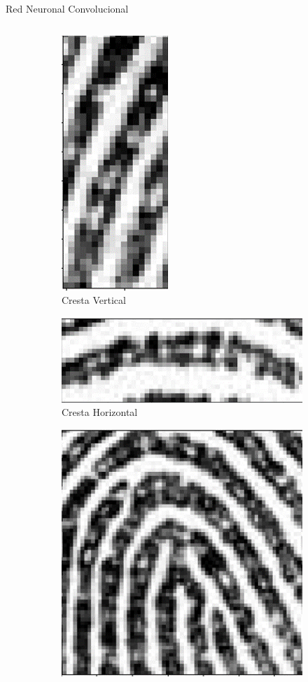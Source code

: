 \documentclass[12pt,aspectratio=169]{beamer}
\begin{document}
\begin{frame}{Red Neuronal Convolucional}
\begin{columns}[c]
\begin{itemize}
                \begin{figure}
                    \begin{subfigure}{0.21\textwidth}
                        \centering
                        \includegraphics[scale=0.1]{figs/fll_0.png}
                        \caption{Cresta Vertical}
                    \end{subfigure}
                    \begin{subfigure}{0.21\textwidth}
                        \centering
                        \includegraphics[scale=0.1]{figs/fll_1.png}
                        \caption{Cresta Horizontal}
                    \end{subfigure}
                    \begin{subfigure}{0.21\textwidth}
                        \centering
                        \includegraphics[scale=0.1]{figs/fhl_0.png}

\end{subfigure}
\end{figure}
\end{itemize}
\end{columns}
\end{frame}
\end{document}
